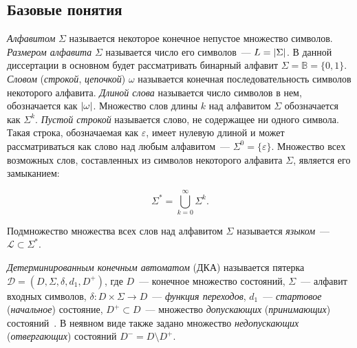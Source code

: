 

\subsection{Базовые понятия} 
\label{sec:review:dfa-inf:dfa-def}

\emph{Алфавитом} $\Sigma$ называется некоторое конечное непустое множество символов.
\emph{Размером алфавита} $\Sigma$ называется число его символов~{---} $L = \lvert\Sigma\rvert$.
В данной диссертации в основном будет рассматривать бинарный алфавит $\Sigma = \mathbb{B} = \{0, 1\}$.
\emph{Словом} (\emph{строкой}, \emph{цепочкой}) $\omega$ называется конечная последовательность символов некоторого алфавита. 
\emph{Длиной слова} называется число символов в нем, обозначается как $\lvert\omega\rvert$.
Множество слов длины $k$ над алфавитом $\Sigma$ обозначается как $\Sigma^{k}$.
\emph{Пустой строкой} называется слово, не содержащее ни одного символа.
Такая строка, обозначаемая как $\varepsilon$, имеет нулевую длиной и может рассматриваться как слово над любым алфавитом~{---} $\Sigma^{0}=\{\varepsilon\}$.
Множество всех возможных слов, составленных из символов некоторого алфавита $\Sigma$, является его замыканием:

\begin{equation*}
\Sigma^{*} = \bigcup_{k=0}^{\infty}\Sigma^{k}.
\end{equation*}

Подмножество множества всех слов над алфавитом $\Sigma$ называется \emph{языком}~--- $\mathcal{L} \subset \Sigma^{*}$.

\emph{Детерминированным конечным автоматом} (ДКА) называется пятерка $\mathcal{D} = \left(D,\Sigma,\delta,d_{1},D^{+}\right)$, где $D$~{---} конечное множество состояний, $\Sigma$~{---} алфавит входных символов, $\delta:D \times \Sigma \rightarrow D$~{---} \emph{функция переходов}, $d_{1}$~{---} \emph{стартовое} (\emph{начальное}) состояние, $D^{+} \subset D$~{---} множество \emph{допускающих} (\emph{принимающих}) состояний~\cite{automata-hopcroft-2001}. 
В неявном виде также задано множество \emph{недопускающих} (\emph{отвергающих}) состояний $D^{-} = D \setminus D^{+}$.


